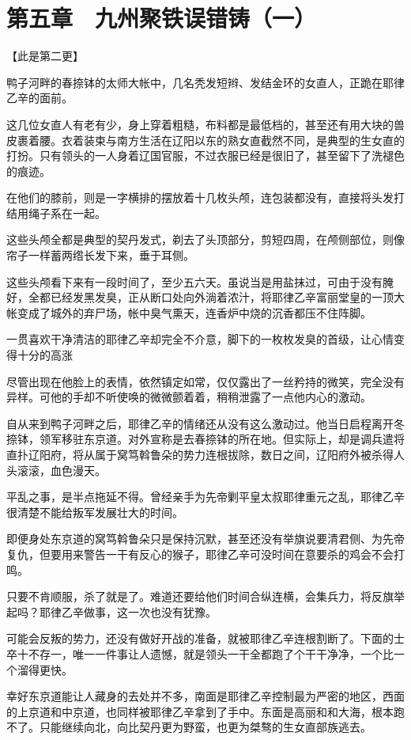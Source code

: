 \section{第五章　九州聚铁误错铸（一）}

【此是第二更】

鸭子河畔的春捺钵的太师大帐中，几名秃发短辫、发结金环的女直人，正跪在耶律乙辛的面前。

这几位女直人有老有少，身上穿着粗糙，布料都是最低档的，甚至还有用大块的兽皮裹着腰。衣着装束与南方生活在辽阳以东的熟女直截然不同，是典型的生女直的打扮。只有领头的一人身着辽国官服，不过衣服已经是很旧了，甚至留下了洗褪色的痕迹。

在他们的膝前，则是一字横排的摆放着十几枚头颅，连包装都没有，直接将头发打结用绳子系在一起。

这些头颅全都是典型的契丹发式，剃去了头顶部分，剪短四周，在颅侧部位，则像帘子一样蓄两绺长发下来，垂于耳侧。

这些头颅看下来有一段时间了，至少五六天。虽说当是用盐抹过，可由于没有腌好，全都已经发黑发臭，正从断口处向外淌着浓汁，将耶律乙辛富丽堂皇的一顶大帐变成了城外的弃尸场，帐中臭气熏天，连香炉中烧的沉香都压不住阵脚。

一贯喜欢干净清洁的耶律乙辛却完全不介意，脚下的一枚枚发臭的首级，让心情变得十分的高涨

尽管出现在他脸上的表情，依然镇定如常，仅仅露出了一丝矜持的微笑，完全没有异样。可他的手却不听使唤的微微颤着着，稍稍泄露了一点他内心的激动。

自从来到鸭子河畔之后，耶律乙辛的情绪还从没有这么激动过。他当日启程离开冬捺钵，领军移驻东京道。对外宣称是去春捺钵的所在地。但实际上，却是调兵遣将直扑辽阳府，将从属于窝笃斡鲁朵的势力连根拔除，数日之间，辽阳府外被杀得人头滚滚，血色漫天。

平乱之事，是半点拖延不得。曾经亲手为先帝剿平皇太叔耶律重元之乱，耶律乙辛很清楚不能给叛军发展壮大的时间。

即便身处东京道的窝笃斡鲁朵只是保持沉默，甚至还没有举旗说要清君侧、为先帝复仇，但要用来警告一干有反心的猴子，耶律乙辛可没时间在意要杀的鸡会不会打鸣。

只要不肯顺服，杀了就是了。难道还要给他们时间合纵连横，会集兵力，将反旗举起吗？耶律乙辛做事，这一次也没有犹豫。

可能会反叛的势力，还没有做好开战的准备，就被耶律乙辛连根割断了。下面的士卒十不存一，唯一一件事让人遗憾，就是领头一干全都跑了个干干净净，一个比一个溜得更快。

幸好东京道能让人藏身的去处并不多，南面是耶律乙辛控制最为严密的地区，西面的上京道和中京道，也同样被耶律乙辛拿到了手中。东面是高丽和和大海，根本跑不了。只能继续向北，向比契丹更为野蛮，也更为桀骜的生女直部族逃去。

